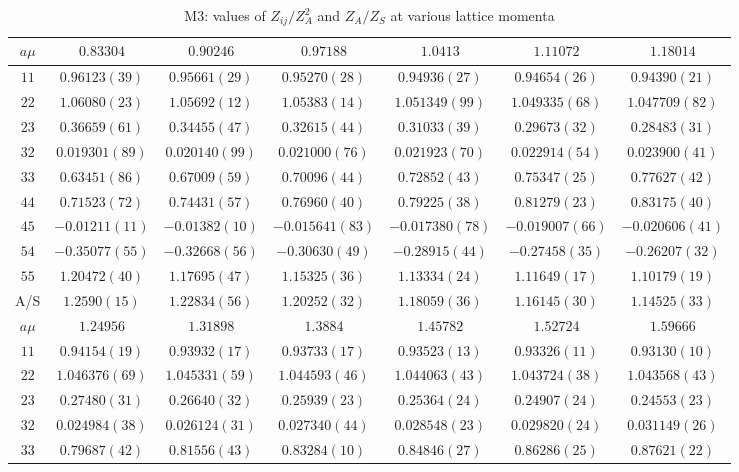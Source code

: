 \begin{table}
\begin{center}
\caption{M3: values of $Z_{ij}/Z_A^2$ and $Z_A/Z_S$ at various lattice momenta}
\begin{tabular}{c|c c c c c c}
\hline
\hline
$a\mu$ & $0.83304$ & $0.90246$ & $0.97188$ & $1.0413$ & $1.11072$ & $1.18014$ \\
\hline
$11$ & $0.96123(39)$ & $0.95661(29)$ & $0.95270(28)$ & $0.94936(27)$ & $0.94654(26)$ & $0.94390(21)$ \\
$22$ & $1.06080(23)$ & $1.05692(12)$ & $1.05383(14)$ & $1.051349(99)$ & $1.049335(68)$ & $1.047709(82)$ \\
$23$ & $0.36659(61)$ & $0.34455(47)$ & $0.32615(44)$ & $0.31033(39)$ & $0.29673(32)$ & $0.28483(31)$ \\
$32$ & $0.019301(89)$ & $0.020140(99)$ & $0.021000(76)$ & $0.021923(70)$ & $0.022914(54)$ & $0.023900(41)$ \\
$33$ & $0.63451(86)$ & $0.67009(59)$ & $0.70096(44)$ & $0.72852(43)$ & $0.75347(25)$ & $0.77627(42)$ \\
$44$ & $0.71523(72)$ & $0.74431(57)$ & $0.76960(40)$ & $0.79225(38)$ & $0.81279(23)$ & $0.83175(40)$ \\
$45$ & $-0.01211(11)$ & $-0.01382(10)$ & $-0.015641(83)$ & $-0.017380(78)$ & $-0.019007(66)$ & $-0.020606(41)$ \\
$54$ & $-0.35077(55)$ & $-0.32668(56)$ & $-0.30630(49)$ & $-0.28915(44)$ & $-0.27458(35)$ & $-0.26207(32)$ \\
$55$ & $1.20472(40)$ & $1.17695(47)$ & $1.15325(36)$ & $1.13334(24)$ & $1.11649(17)$ & $1.10179(19)$ \\
\hline
A/S & $1.2590(15)$ & $1.22834(56)$ & $1.20252(32)$ & $1.18059(36)$ & $1.16145(30)$ & $1.14525(33)$ \\
\hline
$a\mu$ & $1.24956$ & $1.31898$ & $1.3884$ & $1.45782$ & $1.52724$ & $1.59666$ \\
\hline
$11$ & $0.94154(19)$ & $0.93932(17)$ & $0.93733(17)$ & $0.93523(13)$ & $0.93326(11)$ & $0.93130(10)$ \\
$22$ & $1.046376(69)$ & $1.045331(59)$ & $1.044593(46)$ & $1.044063(43)$ & $1.043724(38)$ & $1.043568(43)$ \\
$23$ & $0.27480(31)$ & $0.26640(32)$ & $0.25939(23)$ & $0.25364(24)$ & $0.24907(24)$ & $0.24553(23)$ \\
$32$ & $0.024984(38)$ & $0.026124(31)$ & $0.027340(44)$ & $0.028548(23)$ & $0.029820(24)$ & $0.031149(26)$ \\
$33$ & $0.79687(42)$ & $0.81556(43)$ & $0.83284(10)$ & $0.84846(27)$ & $0.86286(25)$ & $0.87621(22)$ \\

\end{tabular}
\end{center}
\end{table}
